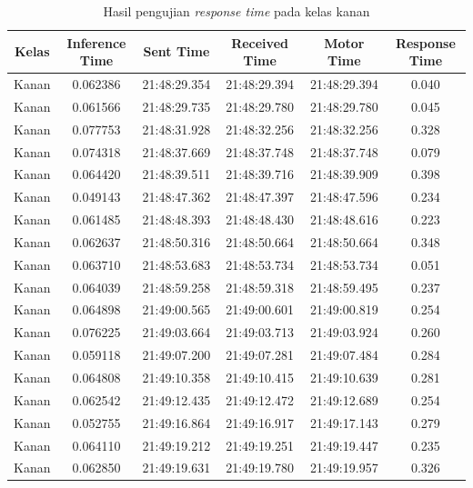 \begin{longtable}{|c|c|c|c|c|c|}
  \caption{Hasil pengujian \emph{response time} pada kelas kanan}
  \label{tb:delaykanan} \\
  \hline
  \rowcolor[HTML]{C0C0C0} 
      \textbf{Kelas} & \textbf{Inference Time} & \textbf{Sent Time} & \textbf{Received Time} & \textbf{Motor Time } & \textbf{Response Time} \\ \hline
      Kanan & 0.062386 & 21:48:29.354 & 21:48:29.394 & 21:48:29.394 & 0.040 \\ \hline
      Kanan & 0.061566 & 21:48:29.735 & 21:48:29.780 & 21:48:29.780 & 0.045 \\ \hline
      Kanan & 0.077753 & 21:48:31.928 & 21:48:32.256 & 21:48:32.256 & 0.328 \\ \hline
      Kanan & 0.074318 & 21:48:37.669 & 21:48:37.748 & 21:48:37.748 & 0.079 \\ \hline
      Kanan & 0.064420 & 21:48:39.511 & 21:48:39.716 & 21:48:39.909 & 0.398 \\ \hline
      Kanan & 0.049143 & 21:48:47.362 & 21:48:47.397 & 21:48:47.596 & 0.234 \\ \hline
      Kanan & 0.061485 & 21:48:48.393 & 21:48:48.430 & 21:48:48.616 & 0.223 \\ \hline
      Kanan & 0.062637 & 21:48:50.316 & 21:48:50.664 & 21:48:50.664 & 0.348 \\ \hline
      Kanan & 0.063710 & 21:48:53.683 & 21:48:53.734 & 21:48:53.734 & 0.051 \\ \hline
      Kanan & 0.064039 & 21:48:59.258 & 21:48:59.318 & 21:48:59.495 & 0.237 \\ \hline
      Kanan & 0.064898 & 21:49:00.565 & 21:49:00.601 & 21:49:00.819 & 0.254 \\ \hline
      Kanan & 0.076225 & 21:49:03.664 & 21:49:03.713 & 21:49:03.924 & 0.260 \\ \hline
      Kanan & 0.059118 & 21:49:07.200 & 21:49:07.281 & 21:49:07.484 & 0.284 \\ \hline
      Kanan & 0.064808 & 21:49:10.358 & 21:49:10.415 & 21:49:10.639 & 0.281 \\ \hline
      Kanan & 0.062542 & 21:49:12.435 & 21:49:12.472 & 21:49:12.689 & 0.254 \\ \hline
      Kanan & 0.052755 & 21:49:16.864 & 21:49:16.917 & 21:49:17.143 & 0.279 \\ \hline
      Kanan & 0.064110 & 21:49:19.212 & 21:49:19.251 & 21:49:19.447 & 0.235 \\ \hline
      Kanan & 0.062850 & 21:49:19.631 & 21:49:19.780 & 21:49:19.957 & 0.326 \\ \hline

\end{longtable}
